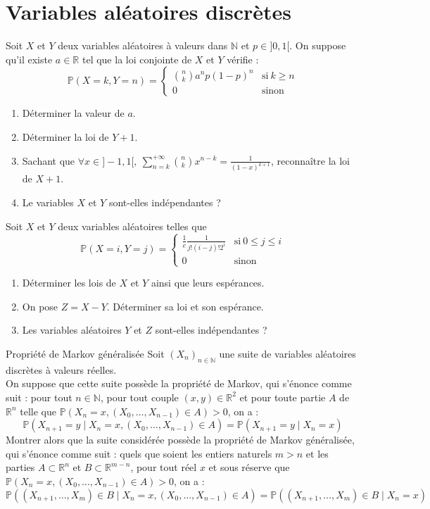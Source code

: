 \documentclass[french,a4paper]{article}
\renewcommand{\P}{\mathbb{P}}
\newcommand{\N}{\mathbb{N}}
\newcommand{\R}{\mathbb{R}}
\theoremstyle{plain}
\theoremstyle{definition}
\theoremstyle{remark}
\begin{document}
\section{Variables aléatoires discrètes}

\begin{ex}{}
	Soit $X$ et $Y$ deux variables aléatoires à valeurs dans $\N$ et $p\in]0,1[$. On suppose qu'il existe $a\in\R$ tel que la loi conjointe de $X$ et $Y$ vérifie : $$\P(X=k,Y=n)=\begin{cases}
		\displaystyle\binom{n}{k}a^np(1-p)^n&\text{si}\ k\geqslant n \\
		0&\text{sinon}
	\end{cases}$$
	\begin{enumerate}
		\item Déterminer la valeur de $a$.
		\item Déterminer la loi de $Y+1$.
		\item Sachant que $\forall x\in]-1,1[,\ \displaystyle\sum_{n=k}^{+\infty}\binom{n}{k}x^{n-k}=\frac{1}{(1-x)^{k+1}}$, reconnaître la loi de $X+1$.
		\item Le variables $X$ et $Y$ sont-elles indépendantes ?
	\end{enumerate}
\end{ex}

\begin{ex}{}
	Soit $X$ et $Y$ deux variables aléatoires telles que $$\P(X=i,Y=j)=\begin{cases}
		\displaystyle\frac{1}{e}\frac{1}{j!(i-j)!2^i}&\text{si}\ 0\leqslant j\leqslant i \\
		0&\text{sinon}
	\end{cases}$$
	\begin{enumerate}
		\item Déterminer les lois de $X$ et $Y$ ainsi que leurs espérances.
		\item On pose $Z=X-Y$. Déterminer sa loi et son espérance.
		\item Les variables aléatoires $Y$ et $Z$ sont-elles indépendantes ?
	\end{enumerate}
\end{ex}

\begin{ex}{Propriété de Markov généralisée}
	Soit $(X_n)_{n\in\N}$ une suite de variables aléatoires discrètes à valeurs réelles. \\
	On suppose que cette suite possède la propriété de Markov, qui s'énonce comme suit : pour tout $n\in\N$, pour tout couple $(x,y)\in\R^2$ et pour toute partie $A$ de $\R^n$ telle que $\P(X_n=x,(X_0,\ldots,X_{n-1})\in A)>0$, on a : $$\P(X_{n+1}=y\mid X_n=x,(X_0,\ldots,X_{n-1})\in A)=\P(X_{n+1}=y\mid X_n=x)$$
	Montrer alors que la suite considérée possède la propriété de Markov généralisée, qui s'énonce comme suit : quels que soient les entiers naturels $m>n$ et les parties $A\subset\R^n$ et $B\subset\R^{m-n}$, pour tout réel $x$ et sous réserve que $\P(X_n=x,(X_0,\ldots,X_{n-1})\in A)>0$, on a : $$\P((X_{n+1},\ldots,X_{m})\in B\mid X_n=x,(X_0,\ldots,X_{n-1})\in A)=\P((X_{n+1},\ldots,X_{m})\in B\mid X_n=x)$$
\end{ex}
\end{document}
